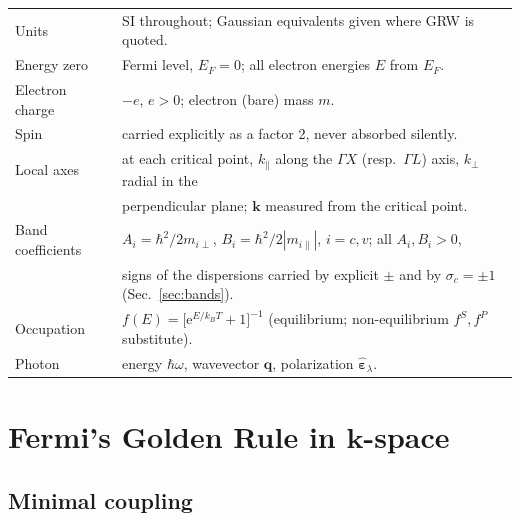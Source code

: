 \documentclass[11pt,a4paper]{article}
\numberwithin{equation}{section}
\newcommand{\hw}{\hbar\omega}
\newcommand{\kperp}{k_{\perp}}
\newcommand{\kpar}{k_{\parallel}}
\newcommand{\eps}{\varepsilon}
\newcommand{\fFD}{f}
\newcommand{\kB}{k_B}
\newcommand{\rme}{\mathrm{e}}
\begin{document}
\begin{center}
\begin{tabular}{ll}
\toprule
Units & SI throughout; Gaussian equivalents given where GRW is quoted.\\
Energy zero & Fermi level, $E_F=0$; all electron energies $E$ from $E_F$.\\
Electron charge & $-e$, $e>0$; electron (bare) mass $m$.\\
Spin & carried explicitly as a factor 2, never absorbed silently.\\
Local axes & at each critical point, $\kpar$ along the $\Gamma X$
             (resp.\ $\Gamma L$) axis, $\kperp$ radial in the\\
           & perpendicular plane; $\mathbf{k}$ measured from the
             critical point.\\
Band coefficients & $A_i=\hbar^2/2m_{i\perp}$, $B_i=\hbar^2/2|m_{i\parallel}|$,
                    $i=c,v$; all $A_i,B_i>0$,\\
                  & signs of the dispersions carried by explicit $\pm$
                    and by $\sigma_c=\pm1$ (Sec.~\ref{sec:bands}).\\
Occupation & $\fFD(E)=\bigl[\rme^{E/\kB T}+1\bigr]^{-1}$
             (equilibrium; non-equilibrium $f^S,f^P$ substitute).\\
Photon & energy $\hw$, wavevector $\mathbf{q}$, polarization
         $\hat{\bm{\eps}}_\lambda$.\\
\bottomrule
\end{tabular}
\end{center}

\section{Fermi's Golden Rule in $\mathbf{k}$-space}\label{sec:fgr}

\subsection{Minimal coupling}
\end{document}
